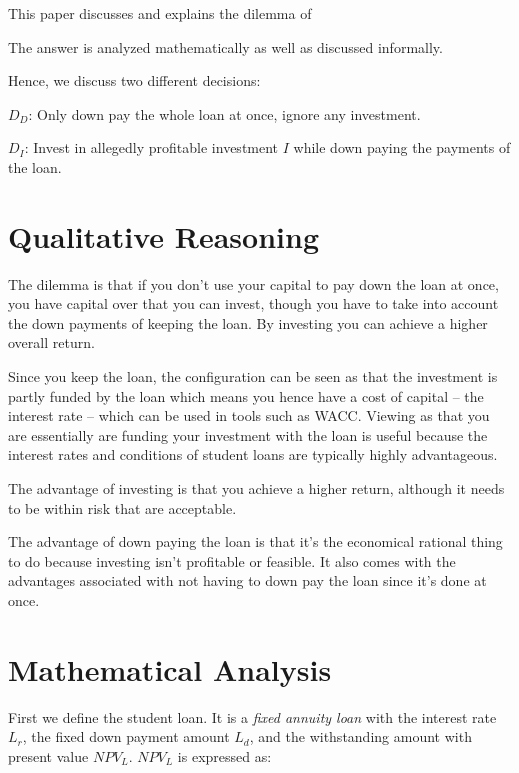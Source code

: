 \documentclass[a4paper]{article}
\title{\documenttitle}
\date{\today}
\author{Frans Englich \\
\href{mailto:fenglich@fastmail.fm}{fenglich@fastmail.fm}}
\begin{document}
\maketitle

This paper discusses and explains the dilemma of 

The answer is analyzed mathematically as well as discussed
informally.

Hence, we discuss two different decisions:

$D_D$: Only down pay the whole loan at once, ignore any investment.

$D_I$: Invest in allegedly profitable investment $I$ while down paying the
payments of the loan.

\section{Qualitative Reasoning}

The dilemma is that if you don't use your capital to pay down the loan at once,
you have capital over that you can invest, though you have to take into account
the down payments of keeping the loan. By investing you can achieve a higher
overall return.

Since you keep the loan, the configuration can be seen as that the investment is
partly funded by the loan which means you hence have a cost of capital -- the
interest rate -- which can be used in tools such as WACC. Viewing as that you
are essentially are funding your investment with the loan is useful because the
interest rates and conditions of student loans are typically highly advantageous.

The advantage of investing is that you achieve a higher return, although it
needs to be within risk that are acceptable.

The advantage of down paying the loan is that it's the economical rational thing
to do because investing isn't profitable or feasible. It also comes with the
advantages associated with not having to down pay the loan since it's done at
once.

\section{Mathematical Analysis}

First we define the student loan. It is a \emph{fixed annuity loan} with the
interest rate $L_r$, the fixed down payment amount $L_d$, and the withstanding
amount with present value $NPV_L$. $NPV_L$ is expressed as:
\end{document}
